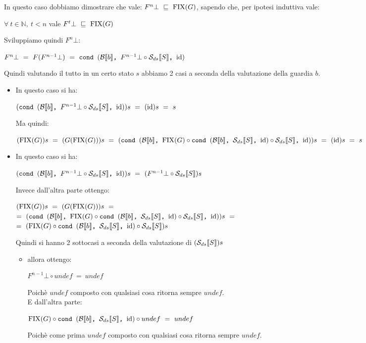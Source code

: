 {	 In questo caso dobbiamo dimostrare che vale:
	$F^{n}\bot~\mineq~\fixp{G}$, sapendo che, per ipotesi induttiva vale:
	\begin{center}
	$\forall~t\in\mathbb{N},~t<n$ vale $F^{t}\bot~\mineq~\fixp{G}$
	\end{center}
	Sviluppiamo quindi $F^{n}\bot$:
	\begin{center}
	$F^{n}\bot~=~F(F^{n-1}\bot)~=~\cond{b}{F^{n-1}\bot{} \circ \Sds{}}{\idDS}$
	\end{center}
	Quindi valutando il tutto in un certo stato $s$ abbiamo 2 casi a seconda
	della valutazione della guardia $b$.
	\begin{itemize}
		\item {} In questo caso si ha:
		\begin{center}
		$(\cond{b}{F^{n-1}\bot{} \circ \Sds{}}{\idDS})s~=~(\idDS)s~=~s$
		\end{center}
		Ma quindi:
		\begin{center}
		$(\fixp{G})s~=~(G(\fixp{G}))s~=~(\cond{b}{\fixp{G} \circ 
		\cond{b}{\Sds{}}{\idDS} \circ{} \Sds{}}{\idDS})s~=~(\idDS)s~=~s$
		\end{center}

		\item {} In questo caso si ha:
		\begin{center}
		$(\cond{b}{F^{n-1}\bot{} \circ \Sds{}}{\idDS})s~=~
		(F^{n-1}\bot{} \circ \Sds{})s$
		\end{center}
		Invece dall'altra parte ottengo:
		\begin{center}
		$(\fixp{G})s~=~(G(\fixp{G}))s~=$\\$=~(\cond{b}{\fixp{G} \circ 
		\cond{b}{\Sds{}}{\idDS} \circ{} \Sds{}}{\idDS})s~=$\\$=~
		(\fixp{G} \circ \cond{b}{\Sds{}}{\idDS} \circ{} \Sds{})s$
		\end{center}

		Quindi si hanno 2 sottocasi a seconda della valutazione di $(\Sds{})s$
		\begin{itemize}
			\item {} allora ottengo:
			\begin{center}
			$F^{n-1}\bot{} \circ undef~=~undef$
			\end{center}
			Poichè $undef$ composto con qualsiasi cosa ritorna sempre $undef$.\\
			E dall'altra parte:
			\begin{center}
			$\fixp{G} \circ \cond{b}{\Sds{}}{\idDS} \circ{} undef~=~undef$
			\end{center}
			Poichè come prima $undef$ composto con qualsiasi cosa ritorna
			sempre $undef$.


\end{itemize}
\end{itemize}}
